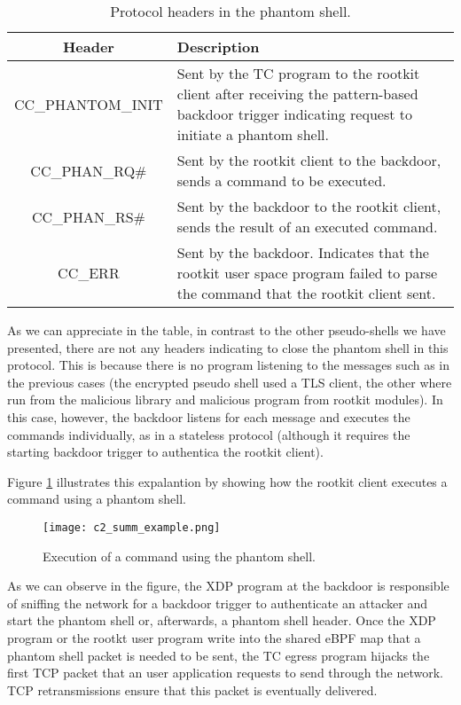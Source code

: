 \begin{table}[htbp]
\begin{tabular}{|c|>{\centering\arraybackslash}p{8cm}|}
\hline
\textbf{Header} & \textbf{Description}\\
\hline
\hline
CC\_PHANTOM\_INIT & Sent by the TC program to the rootkit client after receiving the pattern-based backdoor trigger indicating request to initiate a phantom shell.\\
\hline
CC\_PHAN\_RQ\# & Sent by the rootkit client to the backdoor, sends a command to be executed.\\
\hline
CC\_PHAN\_RS\# & Sent by the backdoor to the rootkit client, sends the result of an executed command.\\
\hline
CC\_ERR & Sent by the backdoor. Indicates that the rootkit user space program failed to parse the command that the rootkit client sent.\\
\hline
\end{tabular}
\caption{Protocol headers in the phantom shell.}
\label{table:phantom_headers}
\end{table}

As we can appreciate in the table, in contrast to the other pseudo-shells we have presented, there are not any headers indicating to close the phantom shell in this protocol. This is because there is no program listening to the messages such as in the previous cases (the encrypted pseudo shell used a TLS client, the other where run from the malicious library and malicious program from rootkit modules). In this case, however, the backdoor listens for each message and executes the commands individually, as in a stateless protocol (although it requires the starting backdoor trigger to authentica the rootkit client).

Figure \ref{fig:c2_summ_example} illustrates this expalantion by showing how the rootkit client executes a command using a phantom shell.

\begin{figure}[htbp]
	\centering
	\texttt{[image: c2\_summ\_example.png]}
	\caption{Execution of a command using the phantom shell.}
	\label{fig:c2_summ_example}
\end{figure}

As we can observe in the figure, the XDP program at the backdoor is responsible of sniffing the network for a backdoor trigger to authenticate an attacker and start the phantom shell or, afterwards, a phantom shell header. Once the XDP program or the rootkt user program write into the shared eBPF map that a phantom shell packet is needed to be sent, the TC egress program hijacks the first TCP packet that an user application requests to send through the network. TCP retransmissions ensure that this packet is eventually delivered.


